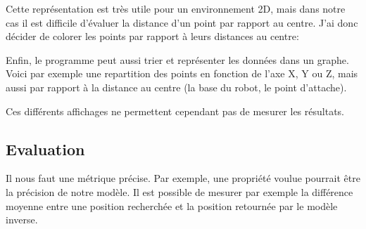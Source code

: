 \documentclass[11pt,french]{article}
\begin{document}
Cette représentation est très utile pour un environnement 2D, mais dans notre cas il est difficile d'évaluer la distance d'un point par rapport au centre. J'ai donc décider de colorer les points par rapport à leurs distances au centre:


Enfin, le programme peut aussi trier et représenter les données dans un graphe. Voici par exemple une repartition des points en fonction de l'axe X, Y ou Z, mais aussi par rapport à la distance au centre (la base du robot, le point d'attache).


Ces différents affichages ne permettent cependant pas de mesurer les résultats.

\subsection{Evaluation}

Il nous faut une métrique précise. Par exemple, une propriété voulue pourrait être la précision de notre modèle. Il est possible de mesurer par exemple la différence moyenne entre une position recherchée et la position retournée par le modèle inverse. 
\end{document}
